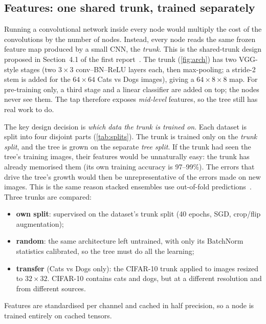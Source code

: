 \subsection{Features: one shared trunk, trained separately}
\label{sec:trunk}

Running a convolutional network inside every node would multiply the cost of the convolutions by the
number of nodes. Instead, every node reads the same frozen feature map produced by a small CNN, the
\emph{trunk}. This is the shared-trunk design proposed in Section~4.1 of the first report~\cite{saini2026tree}. The trunk
(\cref{fig:arch}) has two VGG-style stages (two $3\times3$ conv--BN--ReLU layers each, then max-pooling; a
stride-2 stem is added for the $64\times64$ Cats vs Dogs images), giving a $64\times8\times8$ map. For
pre-training only, a third stage and a linear classifier are added on top; the nodes never see them. The tap
therefore exposes \emph{mid-level} features, so the tree still has real work to do.

The key design decision is \emph{which data the trunk is trained on}. Each dataset is split into four
disjoint parts (\cref{tab:splits}). The trunk is trained only on the \emph{trunk split}, and the tree is
grown on the separate \emph{tree split}. If the trunk had seen the tree's training images, their features
would be unnaturally easy: the trunk has already memorised them (its own training accuracy is 97--99\%).
The errors that drive the tree's growth would then be unrepresentative of the errors made on new images.
This is the same reason stacked ensembles use out-of-fold predictions~\cite{wolpert1992stacked}. Three trunks are compared:
\begin{itemize}
\item \textbf{own split}: supervised on the dataset's trunk split (40 epochs, SGD, crop/flip augmentation);
\item \textbf{random}: the same architecture left untrained, with only its BatchNorm statistics calibrated, so
the tree must do all the learning;
\item \textbf{transfer} (Cats vs Dogs only): the CIFAR-10 trunk applied to images resized to $32\times32$. CIFAR-10
contains cats and dogs, but at a different resolution and from different sources.
\end{itemize}
Features are standardised per channel and cached in half precision, so a node is trained entirely on cached
tensors.

